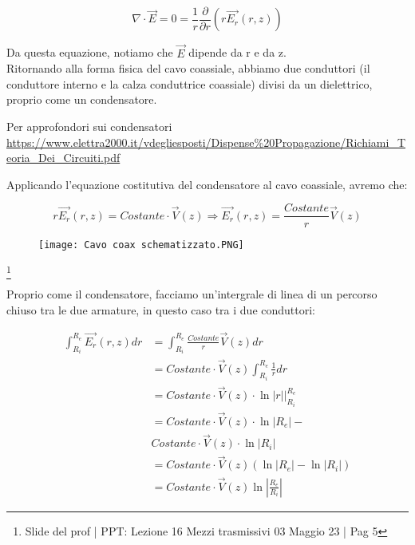 {\Large \begin{equation}
    \nabla \cdot \vec{E} = 0 = \frac{1}{r} \frac{\partial}{\partial r} (r \vec{E_r} (r, z) )
\end{equation}}

Da questa equazione, notiamo che $\vec{E}$ dipende da r e da z. \\ 

Ritornando alla forma fisica del cavo coassiale, 
abbiamo due conduttori (il conduttore interno e la calza conduttrice coassiale) divisi 
da un dielettrico, proprio come un condensatore. \\ 

\begin{tcolorbox}
    Per approfondori sui condensatori \\
    \url{https://www.elettra2000.it/vdegliesposti/Dispense%20Propagazione/Richiami_Teoria_Dei_Circuiti.pdf}
\end{tcolorbox}
 
Applicando l'equazione costitutiva del condensatore al cavo coassiale, avremo che: 

{\Large \begin{equation}
    r \vec{E_r} (r, z) = Costante \cdot \vec{V} (z) 
    \Rightarrow \vec{E_r} (r, z) = \frac{Costante}{r} \vec{V} (z) 
\end{equation}}


\begin{figure}[h]
    \centering
    \texttt{[image: Cavo coax schematizzato.PNG]}
\end{figure} 

\footnote{Slide del prof | PPT: Lezione 16 Mezzi trasmissivi 03 Maggio 23 | Pag 5} 

Proprio come il condensatore, facciamo un'intergrale di linea di un percorso chiuso tra le due armature, 
in questo caso tra i due conduttori: 

{\Large \begin{equation}
    \begin{split}
        \int_{R_i}^{R_e} \vec{E_r}(r, z) dr &= 
        \int_{R_i}^{R_e} \frac{Costante}{r} \vec{V} (z) dr \\
        & =  Costante \cdot \vec{V} (z) \int_{R_i}^{R_e} \frac{1}{r} dr \\ 
        & = Costante \cdot \vec{V} (z) \cdot \ln \left|r\right| \big|_{R_i} ^{R_e}   \\ 
        & =  Costante \cdot \vec{V} (z) \cdot \ln \left|R_e\right| - \\ 
        & Costante \cdot \vec{V} (z) \cdot \ln \left|R_i\right|  \\ 
        & = Costante \cdot \vec{V} (z) (\ln \left|R_e\right| - \ln \left|R_i\right|)  \\ 
        & = Costante \cdot \vec{V} (z) \ln \left|\frac{R_e}{R_i}\right|
    \end{split}
\end{equation}}


